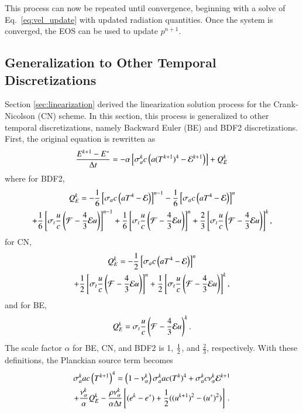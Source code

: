 This process can now be repeated until
convergence, beginning with a solve of Eq.~\eqref{eq:vel_update} with updated
radiation quantities.  Once the system is converged, the EOS can be used to
update $p^{n+1}$.

\subsection{Generalization to Other Temporal Discretizations}

Section \ref{sec:linearization} derived the linearization solution process for
the Crank-Nicolson (CN) scheme. In this section, this process is generalized to
other temporal discretizations, namely Backward Euler (BE) and BDF2
discretizations.  First, the original equation is rewritten as
\begin{align*}
   \frac{E^{k+1} - E^*}{\Delta t} &= - \alpha \left[\sigma_a^k c \left(
   a(T^{k+1})^4 - \mathcal{E}^{k+1}\right)\right]+Q_E^k \\
\end{align*}
where for BDF2,
\begin{multline}
    Q^{k}_E = -\frac{1}{6}\left[\sigma_a c\left( aT^4 - \mathcal{E}\right)\right]^{n-1}
    -\frac{1}{6}\left[\sigma_a c\left( aT^4 - \mathcal{E}\right)\right]^{n} \\
    +\frac{1}{6}\left[\sigma_t \frac{u}{c} \left( \mathcal{F} - \frac{4}{3} \mathcal{E} u \right)\right]^{n-1} + \frac{1}{6}\left[\sigma_t \frac{u}{c} \left( \mathcal{F} - \frac{4}{3} \mathcal{E} u \right)\right]^{n} + \frac{2}{3}\left[\sigma_t \frac{u}{c} \left( \mathcal{F} - \frac{4}{3} \mathcal{E} u \right)\right]^{k},
\end{multline}
for CN,
\begin{multline}
    Q^{k}_E = -\frac{1}{2}\left[\sigma_a c\left( aT^4 - \mathcal{E}\right)\right]^n\\
   +\frac{1}{2}\left[\sigma_t \frac{u}{c} \left( \mathcal{F} - \frac{4}{3} \mathcal{E} u \right)\right]^n + \frac{1}{2}\left[\sigma_t \frac{u}{c} \left( \mathcal{F} - \frac{4}{3} \mathcal{E} u \right)\right]^k,
\end{multline}
and for BE,
\begin{equation*}
    Q^{k}_E = \sigma_t \frac{u}{c} \left( \mathcal{F} - \frac{4}{3} \mathcal{E} u \right)^k.
\end{equation*}
The scale factor $\alpha$ for BE, CN, and BDF2 is 1, $\frac{1}{2}$, and $\frac{2}{3}$,
respectively.  With these definitions, the Planckian source term becomes
\begin{multline}
   \sigma_a^k a c\left(T^{k+1}\right)^4 = \left(1 - \nu_{\alpha}^k\right)
   \sigma_a^k a c (T^k)^4 + \sigma_a^k c \nu_{\alpha}^k \mathcal{E}^{k+1}\\
   +\frac{\nu_{\alpha}^k}{\alpha} Q_E^k - \frac{\rho\nu_{\alpha}^k}{\alpha\Delta t}
   \left[(e^k - e^*) + \frac{1}{2}((u^{k+1})^2 - (u^*)^2)\right] \, .
\end{multline}
